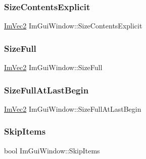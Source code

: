 \subsubsection{\texorpdfstring{Size\+Contents\+Explicit}{SizeContentsExplicit}}
{\footnotesize\ttfamily \hyperlink{struct_im_vec2}{Im\+Vec2} Im\+Gui\+Window\+::\+Size\+Contents\+Explicit}

\hypertarget{struct_im_gui_window_ac3c7eb6b9cd556d56210cbb37caf0c74}{}\label{struct_im_gui_window_ac3c7eb6b9cd556d56210cbb37caf0c74} 
\subsubsection{\texorpdfstring{Size\+Full}{SizeFull}}
{\footnotesize\ttfamily \hyperlink{struct_im_vec2}{Im\+Vec2} Im\+Gui\+Window\+::\+Size\+Full}

\hypertarget{struct_im_gui_window_a284ebffabfd60b81f363173be770cff0}{}\label{struct_im_gui_window_a284ebffabfd60b81f363173be770cff0} 
\subsubsection{\texorpdfstring{Size\+Full\+At\+Last\+Begin}{SizeFullAtLastBegin}}
{\footnotesize\ttfamily \hyperlink{struct_im_vec2}{Im\+Vec2} Im\+Gui\+Window\+::\+Size\+Full\+At\+Last\+Begin}

\hypertarget{struct_im_gui_window_ac620c64ec2897561f719db266f5e9b05}{}\label{struct_im_gui_window_ac620c64ec2897561f719db266f5e9b05} 
\subsubsection{\texorpdfstring{Skip\+Items}{SkipItems}}
{\footnotesize\ttfamily bool Im\+Gui\+Window\+::\+Skip\+Items}

\hypertarget{struct_im_gui_window_a2151ab67f2624bd606883ad346179486}{}\label{struct_im_gui_window_a2151ab67f2624bd606883ad346179486} 
